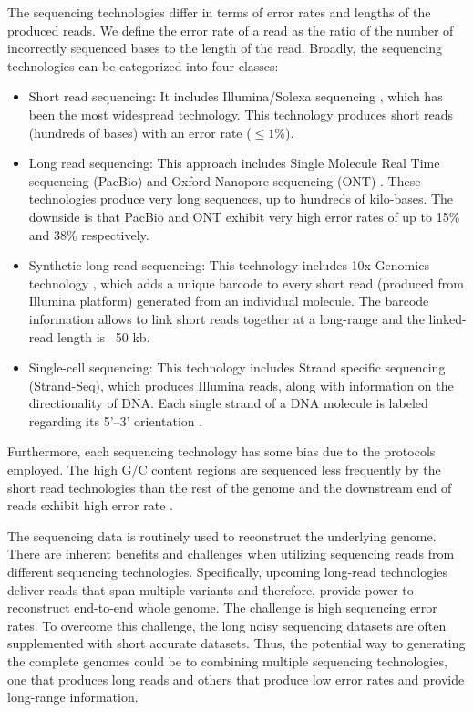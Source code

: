 The sequencing technologies differ in terms of error rates and lengths of the produced reads. We define the error rate of a read as the ratio of the number of incorrectly sequenced bases to the length of the read.
Broadly, the sequencing technologies can be categorized into four classes:
\begin{itemize}
 \item Short read sequencing: It includes Illumina/Solexa sequencing \citep{bentley2008accurate}, which has been the most widespread technology. 
 This technology produces short reads (hundreds of bases) with an error rate ($\le 1$\%). 
  \item Long read sequencing: This approach includes Single Molecule Real Time sequencing (PacBio) \citep{eid2009real} and Oxford Nanopore sequencing (ONT) \citep{laszlo2014decoding}. These technologies produce very long sequences, up to hundreds of kilo-bases. 
  The downside is that PacBio and ONT exhibit very high error rates of up to 15\% and 38\% respectively. 
  \item Synthetic long read sequencing: This technology includes 10x Genomics technology \citep{eisenstein2015startups}, which adds a unique barcode to every short read (produced from Illumina platform) generated from an individual molecule. 
  The barcode information allows to link short reads together at a long-range and the linked-read length is ~50 kb.
 \item Single-cell sequencing: This technology includes Strand specific sequencing (Strand-Seq), which produces Illumina reads, along with information on the directionality of DNA. Each single strand of a DNA molecule is labeled regarding its 5'–3' orientation \citep{falconer2012dna}.
\end{itemize}

Furthermore, each sequencing technology has some bias due to the protocols employed.
The high G/C content regions are sequenced less frequently by the short read technologies than the rest of the genome and the downstream end of reads exhibit high error rate \citep{aird2011analyzing, dohm2008substantial}.

The sequencing data is routinely used to reconstruct the underlying genome. There are inherent benefits and challenges when utilizing sequencing reads from different sequencing technologies. 
Specifically, upcoming long-read technologies deliver reads that span multiple variants and therefore, provide power to reconstruct end-to-end whole genome.
The challenge is high sequencing error rates. To overcome this challenge, the long noisy sequencing datasets are often supplemented with short accurate datasets.
Thus, the potential way to generating the complete genomes could be to combining multiple sequencing technologies, one that produces long reads and others that produce low error rates and provide long-range information.

